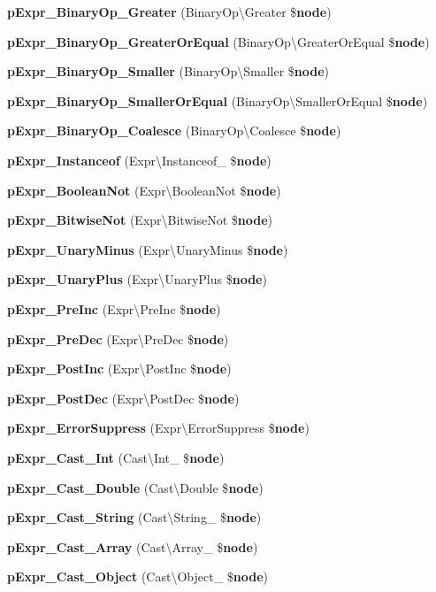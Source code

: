 \begin{DoxyCompactItemize}
{\bf p\+Expr\+\_\+\+Binary\+Op\+\_\+\+Greater} (Binary\+Op\textbackslash{}\+Greater \${\bf node})
\item 
{\bf p\+Expr\+\_\+\+Binary\+Op\+\_\+\+Greater\+Or\+Equal} (Binary\+Op\textbackslash{}\+Greater\+Or\+Equal \${\bf node})
\item 
{\bf p\+Expr\+\_\+\+Binary\+Op\+\_\+\+Smaller} (Binary\+Op\textbackslash{}\+Smaller \${\bf node})
\item 
{\bf p\+Expr\+\_\+\+Binary\+Op\+\_\+\+Smaller\+Or\+Equal} (Binary\+Op\textbackslash{}\+Smaller\+Or\+Equal \${\bf node})
\item 
{\bf p\+Expr\+\_\+\+Binary\+Op\+\_\+\+Coalesce} (Binary\+Op\textbackslash{}\+Coalesce \${\bf node})
\item 
{\bf p\+Expr\+\_\+\+Instanceof} (Expr\textbackslash{}\+Instanceof\+\_\+ \${\bf node})
\item 
{\bf p\+Expr\+\_\+\+Boolean\+Not} (Expr\textbackslash{}\+Boolean\+Not \${\bf node})
\item 
{\bf p\+Expr\+\_\+\+Bitwise\+Not} (Expr\textbackslash{}\+Bitwise\+Not \${\bf node})
\item 
{\bf p\+Expr\+\_\+\+Unary\+Minus} (Expr\textbackslash{}\+Unary\+Minus \${\bf node})
\item 
{\bf p\+Expr\+\_\+\+Unary\+Plus} (Expr\textbackslash{}\+Unary\+Plus \${\bf node})
\item 
{\bf p\+Expr\+\_\+\+Pre\+Inc} (Expr\textbackslash{}\+Pre\+Inc \${\bf node})
\item 
{\bf p\+Expr\+\_\+\+Pre\+Dec} (Expr\textbackslash{}\+Pre\+Dec \${\bf node})
\item 
{\bf p\+Expr\+\_\+\+Post\+Inc} (Expr\textbackslash{}\+Post\+Inc \${\bf node})
\item 
{\bf p\+Expr\+\_\+\+Post\+Dec} (Expr\textbackslash{}\+Post\+Dec \${\bf node})
\item 
{\bf p\+Expr\+\_\+\+Error\+Suppress} (Expr\textbackslash{}\+Error\+Suppress \${\bf node})
\item 
{\bf p\+Expr\+\_\+\+Cast\+\_\+\+Int} (Cast\textbackslash{}\+Int\+\_\+ \${\bf node})
\item 
{\bf p\+Expr\+\_\+\+Cast\+\_\+\+Double} (Cast\textbackslash{}\+Double \${\bf node})
\item 
{\bf p\+Expr\+\_\+\+Cast\+\_\+\+String} (Cast\textbackslash{}\+String\+\_\+ \${\bf node})
\item 
{\bf p\+Expr\+\_\+\+Cast\+\_\+\+Array} (Cast\textbackslash{}\+Array\+\_\+ \${\bf node})
\item 
{\bf p\+Expr\+\_\+\+Cast\+\_\+\+Object} (Cast\textbackslash{}\+Object\+\_\+ \${\bf node})

\end{DoxyCompactItemize}
